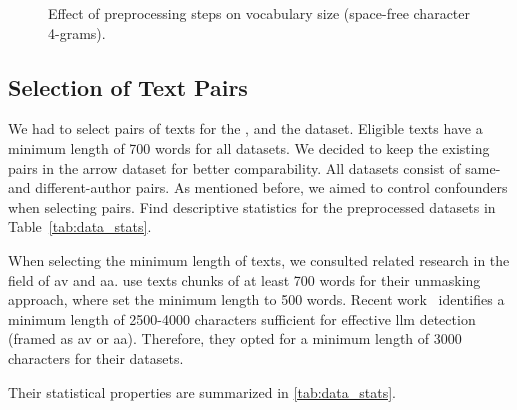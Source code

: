 \begin{figure}[htbp]
    \centering
    
    \caption{Effect of preprocessing steps on vocabulary size (space-free character 4-grams).}
    \label{fig:preprocesing_impact_vocab_size}
\end{figure}

\subsection{Selection of Text Pairs}
\label{subsec:dataset_text_pair_selection}

We had to select pairs of texts for the \dataBlog{}, \dataStudent{} and the \dataGutenberg{} dataset.
Eligible texts have a minimum length of \num{700} words for all datasets.
We decided to keep the existing pairs in the \dataPan{} arrow dataset for better comparability.
All datasets consist of same- and different-author pairs. 
As mentioned before, we aimed to control confounders when selecting pairs.
Find descriptive statistics for the preprocessed datasets in Table~\ref{tab:data_stats}.

When selecting the minimum length of texts, we consulted related research in the field of \ac{av} and \ac{aa}.
\citet{bevendorff_generalizing_2019} use texts chunks of at least 700 words for their unmasking approach, 
where \citet{koppel_authorship_2004} set the minimum length to 500 words.
Recent work~\citep{llm_detection_av_2025} identifies a minimum length of \num{2500}-\num{4000} characters 
sufficient for effective \ac{llm} detection (framed as \ac{av} or \ac{aa}).
Therefore, they opted for a minimum length of \num{3000} characters for their datasets.

Their statistical properties are summarized in \autoref{tab:data_stats}.

